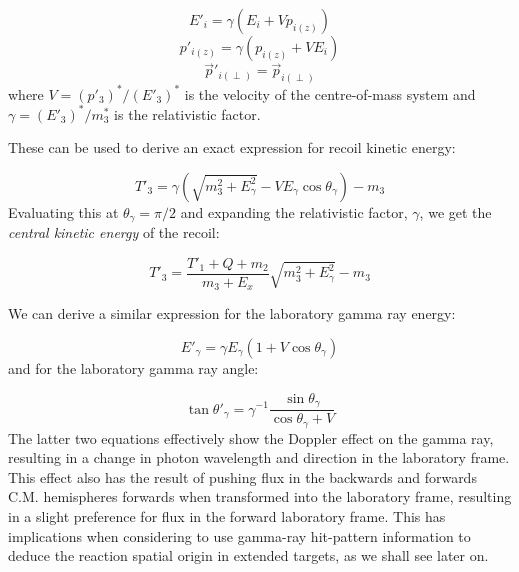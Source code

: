 \begin{equation}
E'_{i}=\gamma(E_{i}+Vp_{i \left( z \right)})
\end{equation}
\begin{equation}
p'_{i \left( z \right)}=\gamma(p_{i \left( z \right)}+VE_{i})
\end{equation}
\begin{equation}
\vec{p}'_{i \left( \perp \right)}=\vec{p}_{i \left( \perp \right)}
\end{equation}
%
where $V=(p'_{3})^{*}/(E'_{3})^{*}$ is the velocity of the centre-of-mass system and $\gamma=(E'_{3})^{*}/m^{*}_{3}$ is the relativistic factor. 

These can be used to derive an exact expression for recoil kinetic energy:

\begin{equation}
\label{eqn:recoilenergy}
T'_{3}=\gamma(\sqrt{m_{3}^{2}+E_{\gamma}^{2}}-VE_{\gamma}\cos{\theta_{\gamma}})-m_{3}
\end{equation}
%
Evaluating this at $\theta_\gamma = \pi / 2$ and expanding the relativistic factor, $\gamma$, we get the {\em central kinetic energy} of the recoil:

\begin{equation}
T'_{3}=\frac{T'_{1}+Q+m_{2}}{m_{3}+E_{x}}\sqrt{m_{3}^{2}+E_{\gamma}^{2}}-m_{3}
\end{equation}

We can derive a similar expression for the laboratory gamma ray energy:

\begin{equation}
E'_{\gamma}=\gamma E_{\gamma}(1+V\cos{\theta_{\gamma}})
\end{equation}
%
and for the laboratory gamma ray angle:

\begin{equation}
\tan{\theta'_{\gamma}}=\gamma^{-1}\frac{\sin{\theta_{\gamma}}}{\cos{\theta_{\gamma}}+V}
\label{eqn:thetagamma}
\end{equation}
%
The latter two equations effectively show the Doppler effect on the gamma ray, resulting in a change in photon wavelength and direction in the laboratory frame. This effect also has the result of pushing flux in the backwards and forwards C.M. hemispheres forwards when transformed into the laboratory frame, resulting in a slight preference for flux in the forward laboratory frame. This has implications when considering to use gamma-ray hit-pattern information to deduce the reaction spatial origin in extended targets, as we shall see later on.  

